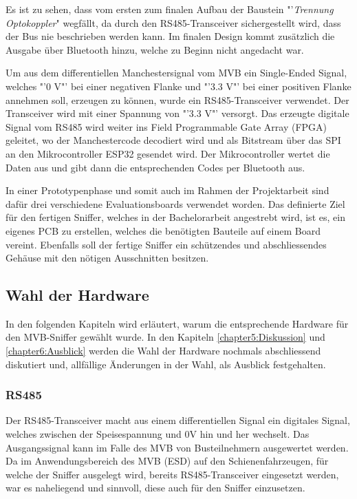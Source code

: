 Es ist zu sehen, dass vom ersten zum finalen Aufbau der Baustein "'\textit{Trennung Optokoppler}" wegfällt, da durch den RS485-Transceiver sichergestellt wird, dass der Bus nie beschrieben werden kann.
Im finalen Design kommt zusätzlich die Ausgabe über Bluetooth hinzu, welche zu Beginn nicht angedacht
war.

Um aus dem differentiellen Manchestersignal vom MVB ein Single-Ended Signal, welches "'0 V"' bei einer 
negativen Flanke und "'3.3 V"' bei einer positiven Flanke annehmen soll, erzeugen zu können, wurde ein
RS485-Transceiver verwendet. Der Transceiver wird mit einer Spannung von "'3.3 V"' versorgt. Das
erzeugte digitale Signal vom RS485 wird weiter ins Field Programmable Gate Array (FPGA) geleitet, wo
der Manchestercode decodiert wird und als Bitstream über das SPI an den Mikrocontroller ESP32 gesendet
wird. Der Mikrocontroller wertet die Daten aus und gibt dann die entsprechenden Codes per Bluetooth aus.

In einer Prototypenphase und somit auch im Rahmen der Projektarbeit sind dafür drei verschiedene
Evaluationsboards verwendet worden. Das definierte Ziel für den fertigen Sniffer, welches in der
Bachelorarbeit angestrebt wird, ist es, ein eigenes PCB zu erstellen, welches die benötigten Bauteile auf
einem Board vereint. Ebenfalls soll der fertige Sniffer ein schützendes und abschliessendes Gehäuse  
mit den nötigen Ausschnitten besitzen.

\subsection{Wahl der Hardware}
In den folgenden Kapiteln wird erläutert, warum die entsprechende Hardware für den MVB-Sniffer gewählt
wurde. In den Kapiteln \ref{chapter5:Diskussion} und \ref{chapter6:Ausblick} werden die Wahl der
Hardware nochmals abschliessend diskutiert und, allfällige Änderungen in der Wahl, als Ausblick 
festgehalten.


\subsubsection{RS485}
Der RS485-Transceiver macht aus einem differentiellen Signal ein digitales Signal, welches zwischen der Speisespannung und 0V hin und her wechselt. Das Ausgangssignal kann im Falle des MVB von Busteilnehmern ausgewertet werden. Da im Anwendungsbereich des MVB (ESD) auf den Schienenfahrzeugen, für welche der Sniffer ausgelegt wird, bereits RS485-Transceiver eingesetzt werden, war es naheliegend und sinnvoll, diese auch für den Sniffer einzusetzen.

